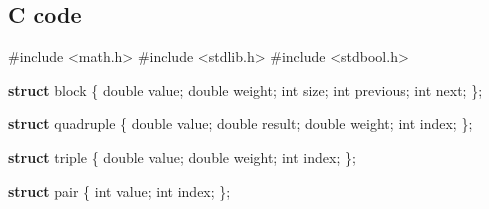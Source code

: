 \documentclass[12pt,]{article}
\newenvironment{Shaded}{\begin{snugshade}}{\end{snugshade}}
\newcommand{\KeywordTok}[1]{\textcolor[rgb]{0.13,0.29,0.53}{\textbf{{#1}}}}
\newcommand{\DataTypeTok}[1]{\textcolor[rgb]{0.13,0.29,0.53}{{#1}}}
\newcommand{\OtherTok}[1]{\textcolor[rgb]{0.56,0.35,0.01}{{#1}}}
\newcommand{\NormalTok}[1]{{#1}}
\begin{document}
\subsection{C code}\label{c-code}

\begin{Shaded}
\begin{Highlighting}[]

\OtherTok{#include <math.h>}
\OtherTok{#include <stdlib.h>}
\OtherTok{#include <stdbool.h>}

\KeywordTok{struct} \NormalTok{block \{}
    \DataTypeTok{double} \NormalTok{value;}
    \DataTypeTok{double} \NormalTok{weight;}
    \DataTypeTok{int} \NormalTok{size;}
    \DataTypeTok{int} \NormalTok{previous;}
    \DataTypeTok{int} \NormalTok{next;}
\NormalTok{\};}

\KeywordTok{struct} \NormalTok{quadruple \{}
    \DataTypeTok{double} \NormalTok{value;}
    \DataTypeTok{double} \NormalTok{result;}
    \DataTypeTok{double} \NormalTok{weight;}
    \DataTypeTok{int} \NormalTok{index;}
\NormalTok{\};}

\KeywordTok{struct} \NormalTok{triple \{}
    \DataTypeTok{double} \NormalTok{value;}
    \DataTypeTok{double} \NormalTok{weight;}
    \DataTypeTok{int} \NormalTok{index;}
\NormalTok{\};}

\KeywordTok{struct} \NormalTok{pair \{}
    \DataTypeTok{int} \NormalTok{value;}
    \DataTypeTok{int} \NormalTok{index;}
\NormalTok{\};}


\end{Highlighting}
\end{Shaded}
\end{document}
